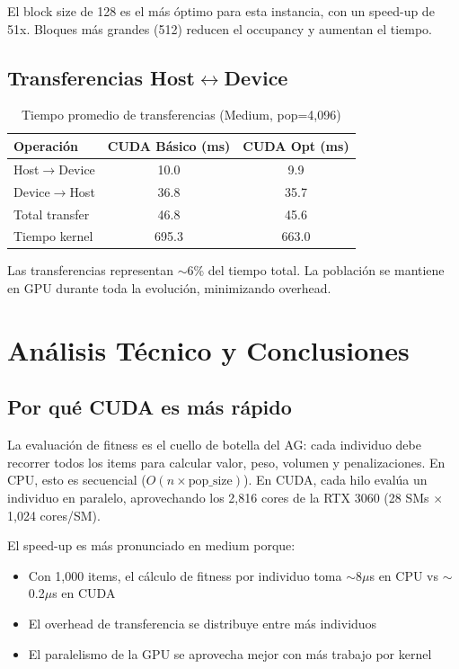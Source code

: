 \documentclass[12pt,a4paper]{article}
\begin{document}
El block size de 128 es el m\'as \'optimo para esta instancia, con un speed-up de 51x. Bloques m\'as grandes (512) reducen el occupancy y aumentan el tiempo.

\subsection{Transferencias Host$\leftrightarrow$Device}

\begin{table}[H]
\centering
\caption{Tiempo promedio de transferencias (Medium, pop=4,096)}
\begin{tabular}{lcc}
\toprule
\textbf{Operaci\'on} & \textbf{CUDA B\'asico (ms)} & \textbf{CUDA Opt (ms)} \\
\midrule
Host$\to$Device & 10.0 & 9.9 \\
Device$\to$Host & 36.8 & 35.7 \\
Total transfer & 46.8 & 45.6 \\
Tiempo kernel & 695.3 & 663.0 \\
\bottomrule
\end{tabular}
\end{table}

Las transferencias representan $\sim$6\% del tiempo total. La poblaci\'on se mantiene en GPU durante toda la evoluci\'on, minimizando overhead.

\section{An\'alisis T\'ecnico y Conclusiones}

\subsection{Por qu\'e CUDA es m\'as r\'apido}

La evaluaci\'on de fitness es el cuello de botella del AG: cada individuo debe recorrer todos los items para calcular valor, peso, volumen y penalizaciones. En CPU, esto es secuencial ($O(n \times \text{pop\_size})$). En CUDA, cada hilo eval\'ua un individuo en paralelo, aprovechando los 2,816 cores de la RTX 3060 (28 SMs $\times$ 1,024 cores/SM).

El speed-up es m\'as pronunciado en medium porque:
\begin{itemize}
  \item Con 1,000 items, el c\'alculo de fitness por individuo toma $\sim$8$\mu$s en CPU vs $\sim$0.2$\mu$s en CUDA
  \item El overhead de transferencia se distribuye entre m\'as individuos
  \item El paralelismo de la GPU se aprovecha mejor con m\'as trabajo por kernel
\end{itemize}
\end{document}
